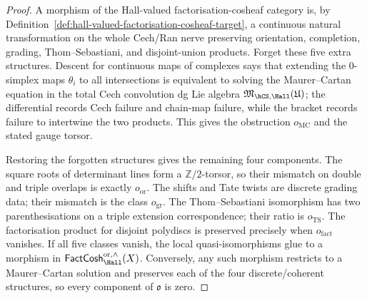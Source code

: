 \begin{proof}
A morphism of the Hall-valued factorisation-cosheaf category is, by
Definition~\ref{def:hall-valued-factorisation-cosheaf-target}, a
continuous natural transformation on the whole Cech/Ran nerve preserving
orientation, completion, grading, Thom--Sebastiani, and disjoint-union
products. Forget these five extra structures. Descent for continuous
maps of complexes says that extending the $0$-simplex maps
$\theta_i$ to all intersections is equivalent to solving the
Maurer--Cartan equation in the total Cech convolution dg Lie algebra
$\mathfrak M_{\hCS,\Hall}(\mathfrak U)$; the differential records Cech
failure and chain-map failure, while the bracket records failure to
intertwine the two products. This gives the obstruction
$o_{\mathrm{MC}}$ and the stated gauge torsor.

Restoring the forgotten structures gives the remaining four components.
The square roots of determinant lines form a $\mathbb Z/2$-torsor, so
their mismatch on double and triple overlaps is exactly
$o_{\mathrm{or}}$. The shifts and Tate twists are discrete grading data;
their mismatch is the class $o_{\mathrm{gr}}$. The
Thom--Sebastiani isomorphism has two parenthesisations on a triple
extension correspondence; their ratio is $o_{\mathrm{TS}}$. The
factorisation product for disjoint polydiscs is preserved precisely when
$o_{\mathrm{fact}}$ vanishes. If all five classes vanish, the local
quasi-isomorphisms glue to a morphism in
$\mathsf{FactCosh}_{\Hall}^{\mathrm{or},\wedge}(X)$. Conversely, any
such morphism restricts to a Maurer--Cartan solution and preserves each
of the four discrete/coherent structures, so every component of
$\mathfrak o$ is zero.
\end{proof}


